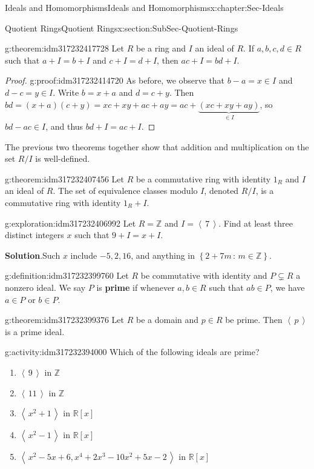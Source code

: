 \documentclass[oneside,10pt,]{book}
\newcommand{\blocktitlefont}{\relax}
\newcommand{\terminology}[1]{\textbf{#1}}
\numberwithin{equation}{section}
\newcommand{\ideal}[1]{\left\langle\, #1 \,\right\rangle}
\newcommand{\setof}[2]{{\left\{#1\,\colon\,#2\right\}}}
\def\Z{{\mathbb Z}}
\def\R{{\mathbb R}}
\begin{document}
\begin{chapterptx}{Ideals and Homomorphisms}{}{Ideals and Homomorphisms}{}{}{x:chapter:Sec-Ideals}
\begin{sectionptx}{Quotient Rings}{}{Quotient Rings}{}{}{x:section:SubSec-Quotient-Rings}
\begin{theorem}{}{}{g:theorem:idm317232417728}
Let \(R\) be a ring and \(I\) an ideal of \(R\). If \(a,b,c,d\in R\) such that \(a+I = b+I\) and \(c+I = d+I\), then \(ac + I = bd + I\).%
\end{theorem}
\begin{proof}{}{g:proof:idm317232414720}
As before, we observe that \(b-a = x\in I\) and \(d-c = y\in I\). Write \(b = x+a\) and \(d = c+y\). Then \(bd = (x+a)(c+y) = xc + xy + ac + ay = ac + \underbrace{(xc+xy+ay)}_{\in I}\), so \(bd - ac \in I\), and thus \(bd + I = ac + I\).%
\end{proof}
The previous two theorems together show that addition and multiplication on the set \(R/I\) is well-defined.%
\begin{theorem}{}{}{g:theorem:idm317232407456}%
Let \(R\) be a commutative ring with identity \(1_R\) and \(I\) an ideal of \(R\). The set of equivalence classes modulo \(I\), denoted \(R/I\), is a commutative ring with identity \(1_R + I\).%
\end{theorem}
\begin{exploration}{}{g:exploration:idm317232406992}%
Let \(R = \Z\) and \(I = \ideal{7}\). Find at least three distinct integers \(x\) such that \(9 + I = x + I\).%
\par\smallskip%
\noindent\textbf{\blocktitlefont Solution}.\hypertarget{g:solution:idm317232401456}{}\quad{}Such \(x\) include \(-5, 2, 16\), and anything in \(\setof{2+7m}{m\in\Z}\).%
\end{exploration}
\begin{definition}{}{g:definition:idm317232399760}%
Let \(R\) be commutative with identity and \(P\subsetneq R\) a nonzero ideal. We say \(P\) is \terminology{prime} if whenever \(a,b\in R\) such that \(ab\in P\), we have \(a\in P\) or \(b\in P\).%
\end{definition}
\begin{theorem}{}{}{g:theorem:idm317232399376}%
Let \(R\) be a domain and \(p\in R\) be prime. Then \(\ideal{p}\) is a prime ideal.%
\end{theorem}
\begin{activity}{}{g:activity:idm317232394000}%
Which of the following ideals are prime?%
\begin{enumerate}
\item{}\(\ideal{9}\) in \(\Z\)%
\item{}\(\ideal{11}\) in \(\Z\)%
\item{}\(\ideal{x^2+1}\) in \(\R[x]\)%
\item{}\(\ideal{x^2-1}\) in \(\R[x]\)%
\item{}\(\ideal{x^2-5x+6, x^4+2x^3-10x^2+5x-2}\) in \(\R[x]\)%

\end{enumerate}
\end{activity}
\end{sectionptx}
\end{chapterptx}
\end{document}
